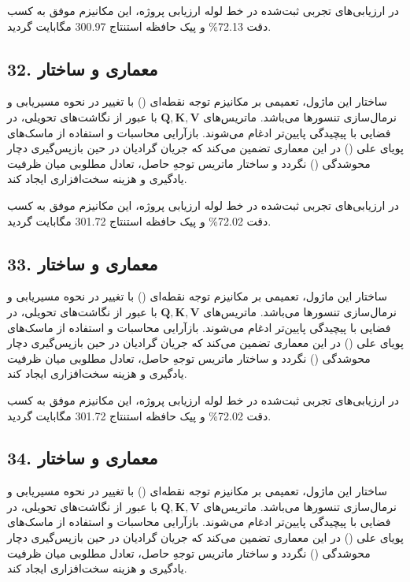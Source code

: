 \documentclass[12pt,a4paper]{report}
\theoremstyle{definition}
\begin{document}
در ارزیابی‌های تجربی ثبت‌شده در خط لوله ارزیابی پروژه، این مکانیزم موفق به کسب دقت 72.13\% و پیک حافظه استنتاج 300.97 مگابایت گردید.

\subsection*{32. معماری و ساختار }
ساختار این ماژول، تعمیمی بر مکانیزم توجه نقطه‌ای () با تغییر در نحوه مسیریابی و نرمال‌سازی تنسورها می‌باشد. ماتریس‌های $\mathbf{Q, K, V}$ با عبور از نگاشت‌های تحویلی، در فضایی با پیچیدگی پایین‌تر ادغام می‌شوند. بازآرایی محاسبات و استفاده از ماسک‌های پویای علی () در این معماری تضمین می‌کند که جریان گرادیان در حین بازپس‌گیری دچار محوشدگی () نگردد و ساختار ماتریس توجهِ حاصل، تعادل مطلوبی میان ظرفیت یادگیری و هزینه سخت‌افزاری ایجاد کند.

در ارزیابی‌های تجربی ثبت‌شده در خط لوله ارزیابی پروژه، این مکانیزم موفق به کسب دقت 72.02\% و پیک حافظه استنتاج 301.72 مگابایت گردید.

\subsection*{33. معماری و ساختار }
ساختار این ماژول، تعمیمی بر مکانیزم توجه نقطه‌ای () با تغییر در نحوه مسیریابی و نرمال‌سازی تنسورها می‌باشد. ماتریس‌های $\mathbf{Q, K, V}$ با عبور از نگاشت‌های تحویلی، در فضایی با پیچیدگی پایین‌تر ادغام می‌شوند. بازآرایی محاسبات و استفاده از ماسک‌های پویای علی () در این معماری تضمین می‌کند که جریان گرادیان در حین بازپس‌گیری دچار محوشدگی () نگردد و ساختار ماتریس توجهِ حاصل، تعادل مطلوبی میان ظرفیت یادگیری و هزینه سخت‌افزاری ایجاد کند.

در ارزیابی‌های تجربی ثبت‌شده در خط لوله ارزیابی پروژه، این مکانیزم موفق به کسب دقت 72.02\% و پیک حافظه استنتاج 301.72 مگابایت گردید.

\subsection*{34. معماری و ساختار }
ساختار این ماژول، تعمیمی بر مکانیزم توجه نقطه‌ای () با تغییر در نحوه مسیریابی و نرمال‌سازی تنسورها می‌باشد. ماتریس‌های $\mathbf{Q, K, V}$ با عبور از نگاشت‌های تحویلی، در فضایی با پیچیدگی پایین‌تر ادغام می‌شوند. بازآرایی محاسبات و استفاده از ماسک‌های پویای علی () در این معماری تضمین می‌کند که جریان گرادیان در حین بازپس‌گیری دچار محوشدگی () نگردد و ساختار ماتریس توجهِ حاصل، تعادل مطلوبی میان ظرفیت یادگیری و هزینه سخت‌افزاری ایجاد کند.
\end{document}
